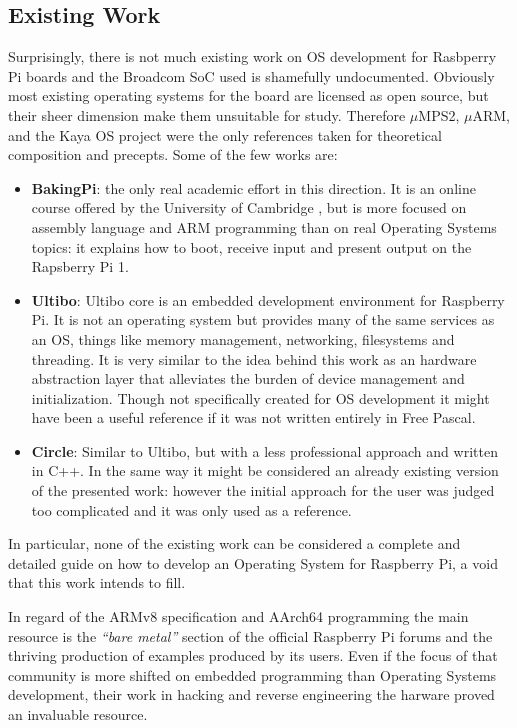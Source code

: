 \documentclass[12pt,a4paper,openright,twoside]{report}
\begin{document}
\subsection{Existing Work}
Surprisingly, there is not much existing work on OS development for Rasbperry Pi 
boards and the Broadcom SoC used is shamefully undocumented. Obviously most existing
operating systems for the board are licensed as open source, but their sheer
dimension make them unsuitable for study.
Therefore $\mu$MPS2, $\mu$ARM, and the Kaya OS project were the only references
taken for theoretical composition and precepts.
Some of the few works are:
\begin{itemize}
    \item \textbf{BakingPi}: the only real academic effort in this direction. It is an
        online course offered by the University of Cambridge \cite{bakingpi}, 
        but is more focused on assembly language and ARM programming than on real
        Operating Systems topics: it explains how to boot, receive input and present
        output on the Rapsberry Pi 1.
    \item \textbf{Ultibo}: Ultibo core is an embedded development environment 
        for Raspberry Pi. It is not an operating system but provides many of 
        the same services as an OS, things like memory management, networking, 
        filesystems and threading. It is very similar to the idea behind this work
        as an hardware abstraction layer that alleviates the burden of device
        management and initialization. Though not specifically created for 
        OS development it might have been a useful reference if it was not
        written entirely in Free Pascal.
    \item \textbf{Circle}: Similar to Ultibo, but with a less professional approach
        and written in C++. In the same way it might be considered an already
        existing version of the presented work: however the initial approach 
        for the user was judged too complicated and it was only used as a reference.
\end{itemize}
In particular, none of the existing work can be considered a complete and detailed
guide on how to develop an Operating System for Raspberry Pi, a void that this
work intends to fill.

In regard of the ARMv8 specification and AArch64 programming the main resource
is the \textit{``bare metal''} section of the official Raspberry Pi forums and the thriving
production of examples produced by its users. Even if the focus of that community
is more shifted on embedded programming than Operating Systems development, their
work in hacking and reverse engineering the harware proved an invaluable resource.
\end{document}
